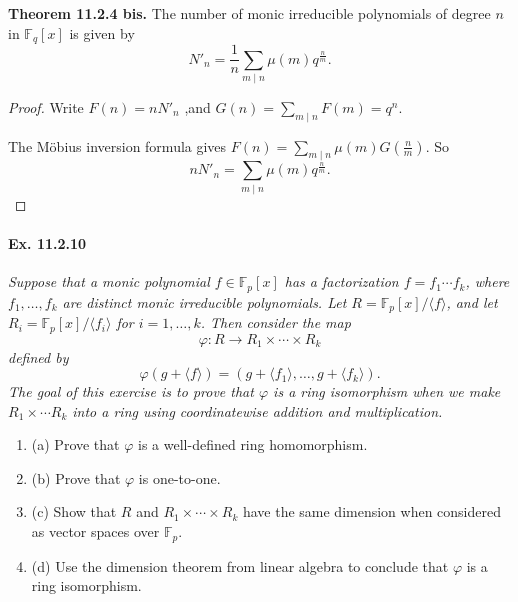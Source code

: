 \documentclass[11pt,a4paper]{article}
\newcommand{\be} {\begin{enumerate}}
\newcommand{\ee} {\end{enumerate}}
\newcommand{\F}{\mathbb{F}}
\begin{document}
{\bf Theorem 11.2.4 bis.}
The number of monic irreducible polynomials of degree $n$ in $\F_q[x]$ is given by
$$N'_n = \frac{1}{n} \sum_{m\mid n} \mu(m) q^{\frac{n}{m}}.$$
\begin{proof}
Write $F(n) = nN'_n$ ,and $G(n) = \sum_{m\mid n}  F(m) = q^n$.

The M\"obius inversion formula gives $F(n) = \sum_{m\mid n} \mu(m) G\left (\frac{n}{m} \right )$. So
$$n N'_n = \sum_{m\mid n} \mu(m) q^{\frac{n}{m}}.$$
\end{proof}

\paragraph{Ex. 11.2.10}

{\it Suppose that a monic polynomial $f\in \F_p[x]$ has a factorization $f = f_1\cdots f_k$, where $f_1,\ldots,f_k$ are distinct monic irreducible polynomials. Let $R = \F_p[x]/\langle f \rangle$, and let $R_i = \F_p[x]/\langle f_i \rangle$ for $i=1,\ldots,k$. Then consider the map
$$\varphi : R \to R_1\times \cdots \times R_k$$
defined by 
$$\varphi(g+\langle f \rangle) = (g+ \langle f_1 \rangle, \ldots, g + \langle f_k \rangle).$$
The goal of this exercise is to prove that $\varphi$ is a ring isomorphism when we make $R_1\times \cdots R_k$ into a ring using coordinatewise addition and multiplication.
\be
\item[(a)] Prove that $\varphi$ is a well-defined ring homomorphism.
\item[(b)] Prove that $\varphi$ is one-to-one.
\item[(c)] Show that $R$ and $R_1\times \cdots \times R_k$ have the same dimension when considered as vector spaces over $\F_p$.
\item[(d)] Use the dimension theorem from linear algebra to conclude that $\varphi$ is a ring isomorphism.
\ee
}
\end{document}
